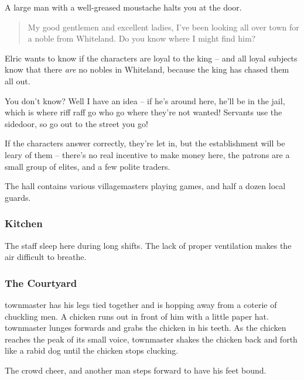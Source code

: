 \begin{boxtext}
	A large man with a well-greased moustache halts you at the door.

	\begin{quotation}
		My good gentlemen and excellent ladies, I've been looking all over town for a noble from Whiteland.  Do you know where I might find him?
	\end{quotation}


\end{boxtext}

	Elric wants to know if the characters are loyal to the king -- and all loyal subjects know that there \emph{are} no nobles in Whiteland, because the king has chased them all out.

	\begin{speechtext}
		You don't know?  Well I have an idea -- if he's around here, he'll be in the jail, which is where riff raff go who go where they're not wanted!  Servants use the sidedoor, so go out to the street you go!
	\end{speechtext}

	If the characters answer correctly, they're let in, but the establishment will be leary of them -- there's no real incentive to make money here, the patrons are a small group of elites, and a few polite traders.

	The hall contains various villagemasters playing games, and half a dozen local guards.

	\subsubsection{Kitchen}
	The staff sleep here during long shifts.  The lack of proper ventilation makes the air difficult to breathe.

	\subsubsection{The Courtyard}

\begin{boxtext}
	\Gls{townmaster} has his legs tied together and is hopping away from a coterie of chuckling men.  A chicken runs out in front of him with a little paper hat.  \Gls{townmaster} lunges forwards and grabs the chicken in his teeth.  As the chicken reaches the peak of its small voice, \gls{townmaster} shakes the chicken back and forth like a rabid dog until the chicken stops clucking.

	The crowd cheer, and another man steps forward to have his feet bound.
\end{boxtext}

